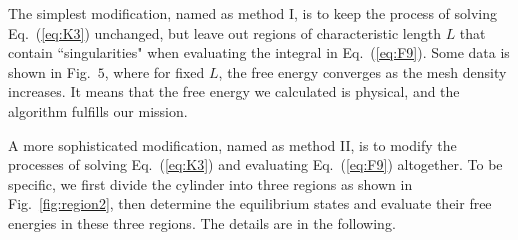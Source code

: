 \documentclass[nottitlepage]{article}
\begin{document}
The simplest modification, named as method I, is to keep the process of solving Eq.~(\ref{eq:K3}) unchanged, but leave out regions of characteristic length $L$ that contain ``singularities" when evaluating the integral in Eq.~(\ref{eq:F9}). Some data is shown in Fig.~$5$, where for fixed $L$, the free energy converges as the mesh density increases. It means that the free energy we calculated is physical, and the algorithm fulfills our mission.

A more sophisticated modification, named as method II, is to modify the processes of solving Eq.~(\ref{eq:K3}) and evaluating Eq.~(\ref{eq:F9}) altogether. %
 To be specific, we first divide the cylinder into three regions as shown in Fig.~\ref{fig:region2}, %
then determine the equilibrium states and evaluate their free energies in these three regions. The details are in the following.
\end{document}
